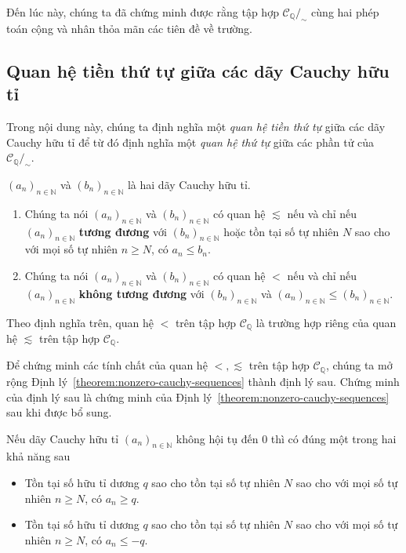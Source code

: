 Đến lúc này, chúng ta đã chứng minh được rằng tập hợp $\mathscr{C}_{\mathbb{Q}}/_{\sim}$ cùng hai phép toán cộng và nhân thỏa mãn các tiên đề về trường.

\subsection{Quan hệ tiền thứ tự giữa các dãy Cauchy hữu tỉ}

Trong nội dung này, chúng ta định nghĩa một \textit{quan hệ tiền thứ tự} giữa các dãy Cauchy hữu tỉ để từ đó định nghĩa một \textit{quan hệ thứ tự} giữa các phần tử của $\mathscr{C}_{\mathbb{Q}}/_{\sim}$.

\begin{definition}
    ${(a_{n})}_{n\in\mathbb{N}}$ và ${(b_{n})}_{n\in\mathbb{N}}$ là hai dãy Cauchy hữu tỉ.
    \begin{enumerate}[label={(\roman*)}]
        \item Chúng ta nói ${(a_{n})}_{n\in\mathbb{N}}$ và ${(b_{n})}_{n\in\mathbb{N}}$ có quan hệ $\lesssim$ nếu và chỉ nếu ${(a_{n})}_{n\in\mathbb{N}}$ \textbf{tương đương} với ${(b_{n})}_{n\in\mathbb{N}}$ hoặc tồn tại số tự nhiên $N$ sao cho với mọi số tự nhiên $n\geq N$, có $a_{n}\leq b_{n}$.
        \item Chúng ta nói ${(a_{n})}_{n\in\mathbb{N}}$ và ${(b_{n})}_{n\in\mathbb{N}}$ có quan hệ $<$ nếu và chỉ nếu ${(a_{n})}_{n\in\mathbb{N}}$ \textbf{không tương đương} với ${(b_{n})}_{n\in\mathbb{N}}$ và ${(a_{n})}_{n\in\mathbb{N}}\leq {(b_{n})}_{n\in\mathbb{N}}$.
    \end{enumerate}
\end{definition}

Theo định nghĩa trên, quan hệ $<$ trên tập hợp $\mathscr{C}_{\mathbb{Q}}$ là trường hợp riêng của quan hệ $\lesssim$ trên tập hợp $\mathscr{C}_{\mathbb{Q}}$.

Để chứng minh các tính chất của quan hệ $<, \lesssim$ trên tập hợp $\mathscr{C}_{\mathbb{Q}}$, chúng ta mở rộng Định lý~\ref{theorem:nonzero-cauchy-sequences} thành định lý sau. Chứng minh của định lý sau là chứng minh của Định lý~\ref{theorem:nonzero-cauchy-sequences} sau khi được bổ sung.
\begin{theorem}\label{theorem:nonzero-cauchy-sequences-and-preorder}
    Nếu dãy Cauchy hữu tỉ ${(a_{n})}_{n\in\mathbb{N}}$ không hội tụ đến $0$ thì có đúng một trong hai khả năng sau
    \begin{itemize}
        \item Tồn tại số hữu tỉ dương $q$ sao cho tồn tại số tự nhiên $N$ sao cho với mọi số tự nhiên $n\geq N$, có $a_{n}\geq q$.
        \item Tồn tại số hữu tỉ dương $q$ sao cho tồn tại số tự nhiên $N$ sao cho với mọi số tự nhiên $n\geq N$, có $a_{n}\leq -q$.
    \end{itemize}
\end{theorem}

